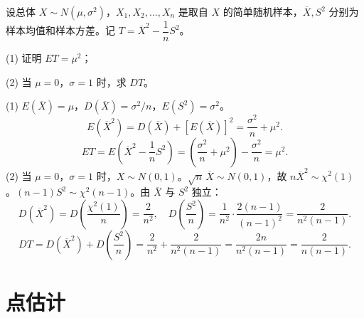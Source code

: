 \documentclass[lang=cn,11pt]{elegantbook}
\begin{document}
\begin{exercise}\label{exer:6-ET-DT}
设总体 \(X \sim N(\mu, \sigma^2)\)，\(X_1, X_2, \dots, X_n\) 是取自 \(X\) 的简单随机样本，\(\overline{X}, S^2\) 分别为样本均值和样本方差。记 \(T = \overline{X}^2 - \dfrac{1}{n}S^2\)。\par
(1) 证明 \(ET = \mu^2\)；\par
(2) 当 \(\mu = 0\)，\(\sigma = 1\) 时，求 \(DT\)。
\end{exercise}
\begin{solution}
(1) \(E(\overline{X}) = \mu\)，\(D(\overline{X}) = \sigma^2/n\)，\(E(S^2) = \sigma^2\)。
\[
E(\overline{X}^2) = D(\overline{X}) + [E(\overline{X})]^2 = \frac{\sigma^2}{n} + \mu^2.
\]
\[
ET = E\!\left(\overline{X}^2 - \frac{1}{n}S^2\right) = \left(\frac{\sigma^2}{n} + \mu^2\right) - \frac{\sigma^2}{n} = \mu^2. 
\]
(2) 当 \(\mu=0\)，\(\sigma=1\) 时，\(X \sim N(0,1)\)。\(\sqrt{n}\,\overline{X} \sim N(0,1)\)，故 \(n\overline{X}^2 \sim \chi^2(1)\)。\((n-1)S^2 \sim \chi^2(n-1)\)。由 \(\overline{X}\) 与 \(S^2\) 独立：
\[
D(\overline{X}^2) = D\!\left(\frac{\chi^2(1)}{n}\right) = \frac{2}{n^2},\quad D\!\left(\frac{S^2}{n}\right) = \frac{1}{n^2}\cdot\frac{2(n-1)}{(n-1)^2} = \frac{2}{n^2(n-1)}.
\]
\[
DT = D(\overline{X}^2) + D\!\left(\frac{S^2}{n}\right) = \frac{2}{n^2} + \frac{2}{n^2(n-1)} = \frac{2n}{n^2(n-1)} = \frac{2}{n(n-1)}.
\]
\end{solution}



\chapter{点估计}
\end{document}
